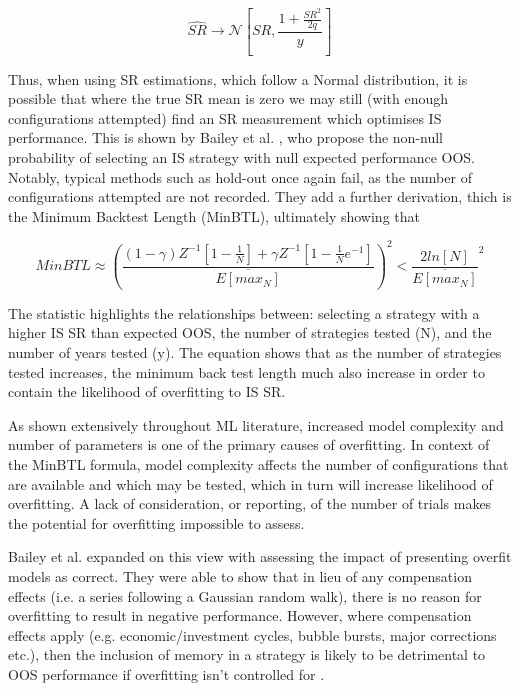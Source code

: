 \documentclass[a4paper,latin]{paper}
\begin{document}
\begin{equation}\label{SRConvergence}
  \hat{SR}  \rightarrow \mathcal {N} [SR,\frac{1 + \frac{SR^2}{2q}}{y}]
\end{equation}

Thus, when using SR estimations, which follow a Normal distribution, it is possible that where the true SR mean is 
zero we may still (with enough configurations attempted) find an SR measurement which optimises IS performance. 
This is shown by Bailey et al. \cite{BaileyBTL}, who propose the non-null probability of selecting an IS strategy with null expected 
performance OOS. Notably, typical methods such as hold-out once again fail, as the number of configurations 
attempted are not recorded. They add a further derivation, thich is the Minimum Backtest Length (MinBTL), ultimately 
showing that

\begin{equation}\label{MinBTL}
MinBTL \approx (\frac{
                                  (1-\gamma)Z^{-1}[1-\frac{1}{N}] + \gamma Z^{-1}[1 -\frac{1}{N}e^{-1}]}
                                  {\overline{E[max_N]}})^2
                                  < \frac{2ln[N]}{\overline{E[max_N]}}^2
\end{equation}

The statistic highlights the relationships between: selecting a strategy with a higher IS SR than expected OOS, 
the number of strategies tested (N), and the number of years tested (y). The equation shows that  as the number 
of strategies tested increases, the minimum back test length much also increase in order to contain the likelihood 
of overfitting to IS SR. 
\hfill \break 

As shown extensively throughout ML literature, increased model complexity and number of parameters is one of 
the primary causes of overfitting. In context of the MinBTL formula, model complexity affects the number of 
configurations that are available and which may be tested, which in turn will increase likelihood of overfitting. 
A lack of consideration, or reporting, of the number of trials makes the potential for overfitting impossible to assess. 
\hfill \break 

Bailey et al. expanded on this view with assessing the impact of presenting overfit models as correct. 
They were able to show that in lieu of any compensation effects (i.e. a series following a Gaussian random walk), 
there is no reason for overfitting to result in negative performance. However, where compensation effects apply 
(e.g. economic/investment cycles, bubble bursts, major corrections etc.), then the inclusion of memory in a strategy
 is likely to be detrimental to OOS performance if overfitting isn’t controlled for \cite{BaileyBTL}.
\hfill \break 
\end{document}
